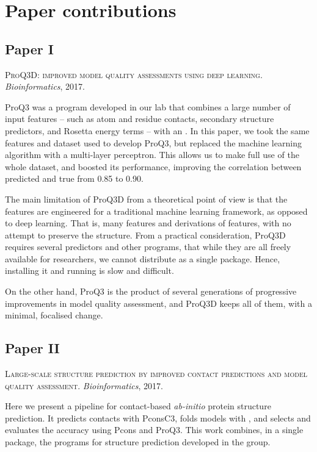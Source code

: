 \chapter{Paper contributions}

\section*{Paper \textcolor[cmyk]{0, 0.87, 0.68, 0.32}{I}}
\begin{center}
	\textsc{ProQ3D: improved model quality assessments using deep learning.}
	\emph{Bioinformatics}, 2017.
\end{center}
\noindent
ProQ3 \citep{ProQ3} was a \MQA{} program developed in our lab that combines a large number of input features -- such as atom and residue contacts, secondary structure predictors, and Rosetta energy terms -- with an \SVM.
In this paper, we took the same features and dataset used to develop ProQ3, but replaced the machine learning algorithm with a multi-layer perceptron.
This allows us to make full use of the whole dataset, and boosted its performance, improving the correlation between predicted and true from 0.85 to 0.90.

The main limitation of ProQ3D from a theoretical point of view is that the features are engineered for a traditional machine learning framework, as opposed to deep learning.
That is, many features and derivations of features, with no attempt to preserve the structure.
From a practical consideration, ProQ3D requires several predictors and other programs, that while they are all freely available for researchers, we cannot distribute as a single package. Hence, installing it and running is slow and difficult.

On the other hand, ProQ3 is the product of several generations of progressive improvements in model quality assessment, and ProQ3D keeps all of them, with a minimal, focalised change. 

\section*{Paper  \textcolor[cmyk]{0, 0.87, 0.68, 0.32}{II}}
\begin{center}
	\textsc{Large-scale structure prediction by improved contact predictions and model quality assessment.}
	\emph{Bioinformatics}, 2017.
\end{center}

\noindent
Here we present a pipeline for contact-based \emph{ab-initio} protein structure prediction.
It predicts contacts with PconsC3, folds models with \CONFOLD, and selects and evaluates the accuracy using Pcons and ProQ3.
This work combines, in a single package, the programs for structure prediction developed in the group.

